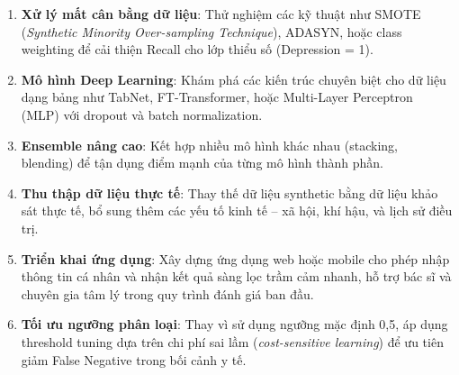\begin{enumerate}[noitemsep]
    \item \textbf{Xử lý mất cân bằng dữ liệu}: Thử nghiệm các kỹ thuật như SMOTE (\textit{Synthetic Minority Over-sampling Technique}), ADASYN, hoặc class weighting để cải thiện Recall cho lớp thiểu số (Depression = 1).
    
    \item \textbf{Mô hình Deep Learning}: Khám phá các kiến trúc chuyên biệt cho dữ liệu dạng bảng như TabNet, FT-Transformer, hoặc Multi-Layer Perceptron (MLP) với dropout và batch normalization.
    
    \item \textbf{Ensemble nâng cao}: Kết hợp nhiều mô hình khác nhau (stacking, blending) để tận dụng điểm mạnh của từng mô hình thành phần.
    
    \item \textbf{Thu thập dữ liệu thực tế}: Thay thế dữ liệu synthetic bằng dữ liệu khảo sát thực tế, bổ sung thêm các yếu tố kinh tế -- xã hội, khí hậu, và lịch sử điều trị.
    
    \item \textbf{Triển khai ứng dụng}: Xây dựng ứng dụng web hoặc mobile cho phép nhập thông tin cá nhân và nhận kết quả sàng lọc trầm cảm nhanh, hỗ trợ bác sĩ và chuyên gia tâm lý trong quy trình đánh giá ban đầu.
    
    \item \textbf{Tối ưu ngưỡng phân loại}: Thay vì sử dụng ngưỡng mặc định 0,5, áp dụng threshold tuning dựa trên chi phí sai lầm (\textit{cost-sensitive learning}) để ưu tiên giảm False Negative trong bối cảnh y tế.
\end{enumerate}
